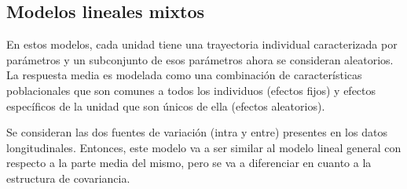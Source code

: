 \documentclass[spanish]{article}
\numberwithin{figure}{subsection}
\numberwithin{equation}{subsection}
\numberwithin{table}{subsection}
\begin{document}



\subsection{Modelos lineales mixtos}

En estos modelos, cada unidad tiene una trayectoria individual caracterizada
por parámetros y un subconjunto de esos parámetros ahora se consideran
aleatorios. La respuesta media es modelada como una combinación de
características poblacionales que son comunes a todos los individuos (efectos
fijos) y efectos específicos de la unidad que son únicos de ella (efectos
aleatorios).

Se consideran las dos fuentes de variación (intra y entre) presentes en los
datos longitudinales. Entonces, este modelo va a ser similar al modelo lineal
general con respecto a la parte media del mismo, pero se va a diferenciar en
cuanto a la estructura de covariancia.
\end{document}
